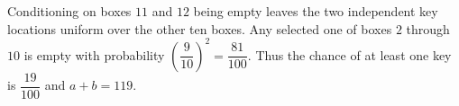 Conditioning on boxes $11$ and $12$ being empty leaves the two independent key locations uniform over the other ten boxes. Any selected one of boxes $2$ through $10$ is empty with probability $(\dfrac{9}{10})^2=\dfrac{81}{100}$. Thus the chance of at least one key is $\dfrac{19}{100}$ and $a+b=\boxed{119}$.
